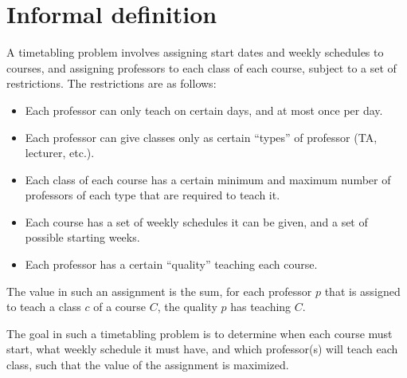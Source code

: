 \section{Informal definition}

A timetabling problem involves assigning start dates and weekly schedules to courses, and assigning professors to each class of each course, subject to a set of restrictions. The restrictions are as follows:

\begin{itemize}
\item Each professor can only teach on certain days, and at most once per day.
\item Each professor can give classes only as certain ``types'' of professor (TA, lecturer, etc.).
\item Each class of each course has a certain minimum and maximum number of professors of each type that are required to teach it.
\item Each course has a set of weekly schedules it can be given, and a set of possible starting weeks.
\item Each professor has a certain ``quality'' teaching each course.
\end{itemize}

The value in such an assignment is the sum, for each professor $p$ that is assigned to teach a class $c$ of a course $C$, the quality $p$ has teaching $C$.

The goal in such a timetabling problem is to determine when each course must start, what weekly schedule it must have, and which professor(s) will teach each class, such that the value of the assignment is maximized.
